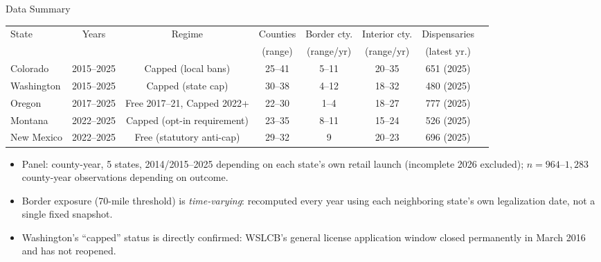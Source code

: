\documentclass[aspectratio=169,11pt]{beamer}
\begin{document}
\begin{frame}{Data Summary}
\footnotesize
\begin{table}
\centering
\begin{tabular}{lccccccc}
\toprule
State & Years & Regime & Counties & Border cty. & Interior cty. & Dispensaries \\
 & & & (range) & (range/yr) & (range/yr) & (latest yr.) \\
\midrule
Colorado   & 2015--2025 & Capped (local bans)         & 25--41 & 5--11  & 20--35 & 651 (2025) \\
Washington & 2015--2025 & Capped (state cap)          & 30--38 & 4--12  & 18--32 & 480 (2025) \\
Oregon     & 2017--2025 & Free 2017--21, Capped 2022+ & 22--30 & 1--4   & 18--27 & 777 (2025) \\
Montana    & 2022--2025 & Capped (opt-in requirement) & 23--35 & 8--11  & 15--24 & 526 (2025) \\
New Mexico & 2022--2025 & Free (statutory anti-cap)   & 29--32 & 9      & 20--23 & 696 (2025) \\
\bottomrule
\end{tabular}
\end{table}
\vspace{0.3em}
\normalsize
\begin{itemize}
\item Panel: county-year, 5 states, 2014/2015--2025 depending on each state's own retail launch (incomplete
2026 excluded); $n=964$--$1{,}283$ county-year observations depending on outcome.
\item Border exposure (70-mile threshold) is \emph{time-varying}: recomputed every year using each
neighboring state's own legalization date, not a single fixed snapshot.
\item Washington's ``capped'' status is directly confirmed: WSLCB's general license application window closed
permanently in March 2016 and has not reopened.
\end{itemize}
\end{frame}
\end{document}
